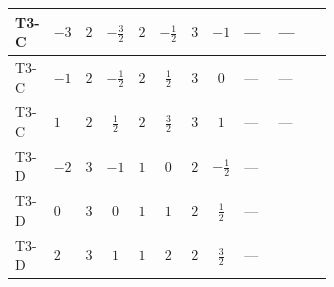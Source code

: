 \documentclass[8pt]{article}
\begin{document}
\begin{landscape}
\begin{longtable}{@{}llcccccc >{\raggedright\arraybackslash}p{0.21\linewidth} >{\raggedright\arraybackslash}p{0.21\linewidth} >{\raggedright\arraybackslash}p{0.21\linewidth}@{}}
\midrule
T3-C & $-3$ & $2$ & $-\frac{3}{2}$ & $2$ & $-\frac{1}{2}$ & $3$ & $-1$ & --- & --- & \scriptsize\adjustbox{max width=\linewidth}{$\begin{gathered} +3 {\lambda_5} \left({\lambda_5}\right)^{*}\end{gathered}$} \\
\midrule
T3-C & $-1$ & $2$ & $-\frac{1}{2}$ & $2$ & $\frac{1}{2}$ & $3$ & $0$ & --- & --- & \scriptsize\adjustbox{max width=\linewidth}{$\begin{gathered} +3 {\lambda_5} \left({\lambda_5}\right)^{*}\end{gathered}$} \\
\midrule
T3-C & $1$ & $2$ & $\frac{1}{2}$ & $2$ & $\frac{3}{2}$ & $3$ & $1$ & --- & --- & \scriptsize\adjustbox{max width=\linewidth}{$\begin{gathered} +3 {\lambda_5} \left({\lambda_5}\right)^{*}\end{gathered}$} \\
\midrule
T3-D & $-2$ & $3$ & $-1$ & $1$ & $0$ & $2$ & $-\frac{1}{2}$ & --- & \scriptsize\adjustbox{max width=\linewidth}{$\begin{gathered} -4 \operatorname{Tr}\!\left({y_1}\,\left({y_1}\right)^{\dagger}\,{y_2}\,\left({y_2}\right)^{\dagger}\right)\end{gathered}$} & \scriptsize\adjustbox{max width=\linewidth}{$\begin{gathered} +4 {\lambda_5} \left({\lambda_5}\right)^{*}\end{gathered}$} \\
\midrule
T3-D & $0$ & $3$ & $0$ & $1$ & $1$ & $2$ & $\frac{1}{2}$ & --- & \scriptsize\adjustbox{max width=\linewidth}{$\begin{gathered} -4 \operatorname{Tr}\!\left({y_1}\,\left({y_1}\right)^{\dagger}\,{y_2}\,\left({y_2}\right)^{\dagger}\right)\end{gathered}$} & \scriptsize\adjustbox{max width=\linewidth}{$\begin{gathered} +4 {\lambda_5} \left({\lambda_5}\right)^{*}\end{gathered}$} \\
\midrule
T3-D & $2$ & $3$ & $1$ & $1$ & $2$ & $2$ & $\frac{3}{2}$ & --- & \scriptsize\adjustbox{max width=\linewidth}{$\begin{gathered} -4 \operatorname{Tr}\!\left({y_1}\,\left({y_1}\right)^{\dagger}\,{y_2}\,\left({y_2}\right)^{\dagger}\right)\end{gathered}$} & \scriptsize\adjustbox{max width=\linewidth}{$\begin{gathered} +4 {\lambda_5} \left({\lambda_5}\right)^{*}\end{gathered}$} \\

\end{longtable}
\end{landscape}
\end{document}
